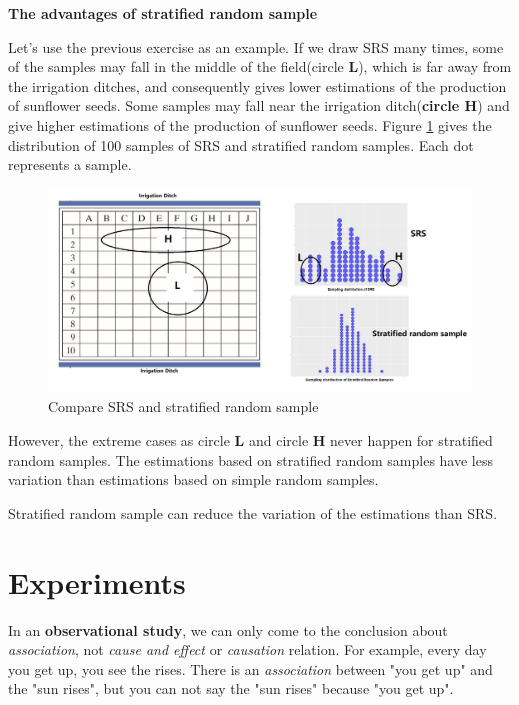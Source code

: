 \documentclass[a4paper, 12pt,twoside]{book}
\begin{document}
\textbf{\large{The advantages of stratified random sample}}
\vspace{0.3cm}

Let's use the previous exercise as an example. If we draw SRS many times, some of the samples may fall in the middle of the field(circle \textbf{L}), which is far away from the irrigation  ditches, and consequently gives lower estimations of the production of sunflower seeds. Some samples may fall near the irrigation ditch(\textbf{circle \textbf{H}}) and give higher estimations of the production of sunflower seeds. Figure \ref{CompareSRSandStratifiedRS} gives the distribution of 100 samples of SRS and stratified random samples. Each dot represents a sample.

    \begin{figure}[H]
        \centering
        \includegraphics[scale=0.4]{CompareSRSandStratifiedRS}
        \caption{Compare SRS and stratified random sample
                \label{CompareSRSandStratifiedRS}}
    \end{figure}
    
    However, the extreme cases as circle \textbf{L} and circle \textbf{H} never happen for stratified random samples. The estimations based on stratified random samples have less variation than estimations based on simple random samples. 
    \vspace{0.3cm}
    
    \colorbox{babypink}{\parbox{\textwidth}{    
        Stratified random sample can reduce the variation of the estimations than SRS.
    }}
    \newpage
    
\section{Experiments}


In an \textbf{observational study}, we can only come to the conclusion about \textit{association}, not \textit{cause and effect} or \textit{causation} relation. For example, every day you get up, you see the rises. There is an \textit{association} between "you get up" and the "sun rises", but you can not say the "sun rises" because "you get up".
\vspace{0.3cm}
\end{document}
